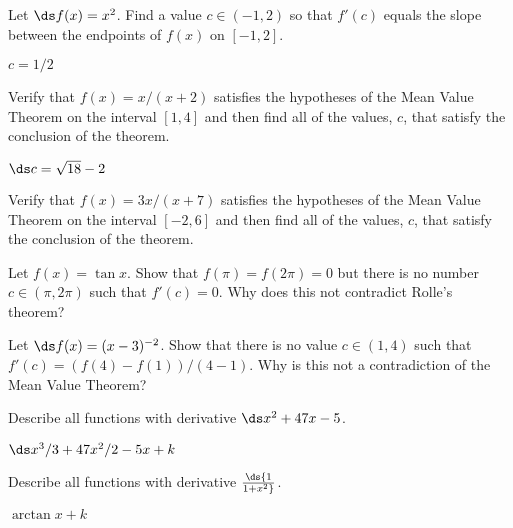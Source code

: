 \begin{exercises}

\begin{exercise} Let $\ds f(x) = x^2$.
Find a value $c\in (-1,2)$ so that $f'(c)$ equals the slope between
the endpoints of $f(x)$ on $[-1,2]$.
\begin{answer} $c=1/2$
\end{answer}\end{exercise}

\begin{exercise} Verify that $f(x) = x/(x+2)$ satisfies the hypotheses of the
 Mean Value Theorem on the interval $[1,4]$ and then find all of the
 values, $c$, that satisfy the conclusion of the theorem.
\begin{answer} $\ds c=\sqrt{18}-2$
\end{answer}\end{exercise}

\begin{exercise}
Verify that $f(x) = 3x/(x+7)$ satisfies the hypotheses of the
 Mean Value Theorem on the interval $[-2 , 6]$ and then find all of the
 values, $c$, that satisfy the conclusion of the theorem.
\end{exercise}

\begin{exercise} Let $f(x) = \tan x $. Show that $f(\pi ) = f(2\pi)=0$ but
there is no number $c\in (\pi,2\pi)$ such that $f'(c) =0$. Why does
this not contradict Rolle's theorem?
\end{exercise}

\begin{exercise} Let $\ds f(x) = (x-3)^{-2}$.  Show that there is no value 
$c\in (1,4)$ such that $f'(c) = (f(4)-f(1))/(4-1)$.  Why is
this not a contradiction of the Mean Value Theorem?
\end{exercise}

\begin{exercise} Describe all functions with derivative $\ds x^2+47x-5$.
\begin{answer} $\ds x^3/3+47x^2/2-5x+k$
\end{answer}\end{exercise}

\begin{exercise} Describe all functions with derivative $\ds {1\over 1+x^2}$.
\begin{answer} $\arctan x + k$
\end{answer}\end{exercise}


\end{exercises}

